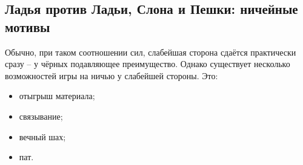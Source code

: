 \subsection*{Ладья против Ладьи, Слона и Пешки: ничейные мотивы}
\markright{}

Обычно, при таком соотношении сил, слабейшая сторона сдаётся практически сразу -- у чёрных подавляющее преимущество. Однако существует несколько возможностей игры на ничью у слабейшей стороны. Это: 
\begin{itemize}
\setlength\itemsep{-0.25em}
\item отыгрыш материала; 
\item связывание; 
\item вечный шах; 
\item пат. 
\end{itemize}


